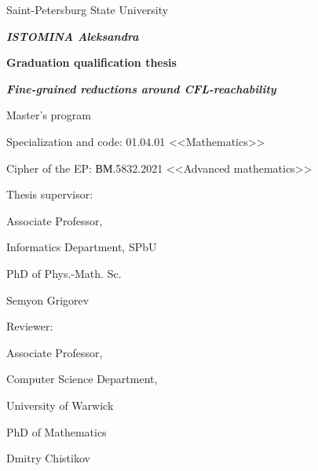 \documentclass[12pt]{article}
\begin{document}
\fontsize{12pt}{12pt}\selectfont

\newpage 

    \vspace{3.3cm}
    \centerline{\normalsize Saint-Petersburg State University}

\vspace{3.3cm}

\begin{center}
    \bf\textit{\normalsize ISTOMINA Aleksandra}
\end{center}

\begin{center}
    \bf\normalsize Graduation qualification thesis
\end{center}

\begin{center}
	\bf\textit{\normalsize
    Fine-grained reductions around CFL-reachability}
\end{center}

\vspace{0.7cm}

\begin{center}
\normalsize
    Master's program
    
    Specialization and code: 01.04.01 <<Mathematics>>
    
    Cipher of the EP: ВМ.5832.2021 <<Advanced mathematics>>
    
    
\end{center}

\vspace{1.2cm}

{\parindent=9.5cm \normalsize
	Thesis supervisor: \par
	Associate Professor, \par
	Informatics Department, SPbU \par
	PhD of Phys.-Math. Sc.  \par
	Semyon Grigorev \par}

\vspace{0.8cm}

{\parindent=9.5cm \normalsize
	Reviewer: \par
	 Associate Professor, \par
	 Computer Science Department, \par 
	 University of Warwick \par
	 PhD of Mathematics \par
	 Dmitry Chistikov \par}
\end{document}
